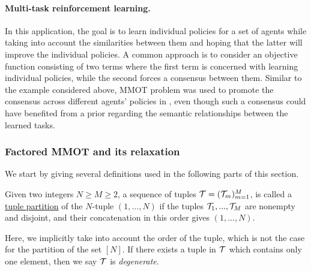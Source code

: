 \paragraph{Multi-task reinforcement learning.} In this application, the goal is to learn
individual policies for a set of agents while taking into account the similarities between them
and hoping that the latter will improve the individual policies. A common approach is
to consider an objective function consisting of two terms where the first term is concerned
with learning individual policies, while the second forces a consensus between them.
Similar to the example considered above, MMOT problem was used to promote the consensus
across different agents' policies in \citep{Cohen21}, even though such a consensus
could have benefited from a prior regarding the semantic relationships between the learned tasks.
%

\subsubsection{Factored MMOT and its relaxation}
We start by giving several definitions used in the following parts of this section.
\begin{definition}
 Given two integers $N \geq M \geq 2$, a sequence of tuples $\mathcal T = (\mathcal T_m)_{m=1}^M$, is called a
 \underline{tuple partition} of the $N$-tuple $(1,...,N)$ if the tuples $\mathcal T_1, ..., \mathcal T_M$ are nonempty and disjoint,
 and their concatenation in this order gives $(1,...,N)$.
\end{definition}
Here, we implicitly take into account the order of the tuple, which is not the case for the partition of the set $[N]$. If
there exists a tuple in $\mathcal T$ which contains only one element, then we say $\mathcal T$ is \textit{degenerate}.

